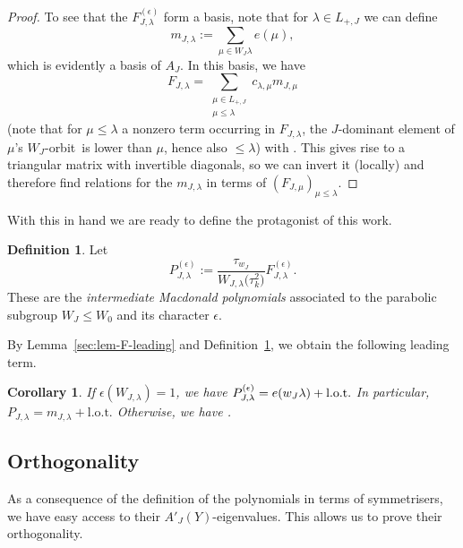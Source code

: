 \documentclass[pdftex]{sigma}
\newtheorem{Corollary}[Theorem]{Corollary}
\theoremstyle{definition}
\newtheorem{Definition}[Theorem]{Definition}
\numberwithin{equation}{section}
\begin{document}
\begin{proof}
 To see that the $F^{(\epsilon)}_{J,\lambda}$ form a basis, note that for $\lambda\in L_{+,J}$ we can define
 \[
 m_{J,\lambda}:= \sum_{\mu\in W_J\lambda} e(\mu),
 \]
 which is evidently a basis of $A_J$. In this basis, we have
 \[
 F_{J,\lambda} = \sum_{\substack{\mu\in L_{+,J}\\\mu\le\lambda}} c_{\lambda,\mu} m_{J,\mu}
 \]
 (note that for $\mu\le\lambda$ a nonzero term occurring in $F_{J,\lambda}$, the $J$-dominant
 element of $\mu$'s $W_J$-orbit~is lower than $\mu$, hence also $\le \lambda$) with
 . This gives rise to a triangular matrix
 with invertible diagonals, so we can invert it (locally) and therefore find relations for the
 $m_{J,\lambda}$ in terms of $(F_{J,\mu})_{\mu\le\lambda}$.
\end{proof}

With this in hand we are ready to define the protagonist of this work.
\begin{Definition}\label{sec:def-P}
 Let
 \[
 P^{(\epsilon)}_{J,\lambda} := \frac{\tau_{w_J}}{W_{J,\lambda}\bigl(\tau_k^2\bigr)} F^{(\epsilon)}_{J,\lambda}.
 \]
 These are the \emph{intermediate Macdonald polynomials} associated to the parabolic subgroup
 \linebreak ${W_J \le W_0}$ and its character $\epsilon$.
\end{Definition}

By Lemma~\ref{sec:lem-F-leading} and Definition~\ref{sec:def-P}, we obtain
the following leading term.

\begin{Corollary}\label{sec:cor-leading-coeffs}
 If $\epsilon(W_{J,\lambda})=1$, we have
$\smash{P^{(\epsilon)}_{J,\lambda} = e(w_J \lambda)} +\text{l.o.t.}$
 In particular,
$
 P_{J,\lambda} = m_{J,\lambda} +\text{l.o.t.}$
 Otherwise, we have
.
\end{Corollary}

\subsection{Orthogonality}
As a consequence of the definition of the polynomials  in terms of symmetrisers, we have easy access to their
$A'_J(Y)$-eigenvalues. This allows us to prove their orthogonality.
\end{document}
